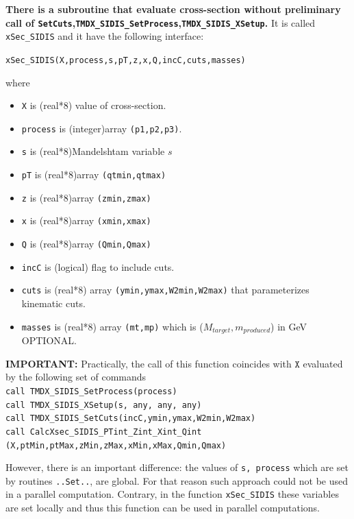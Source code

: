 \documentclass[prd,nofootinbib,eqsecnum,final]{revtex4}
\renewcommand{\(}{\left(}
\renewcommand{\)}{\right)}
\renewcommand{\[}{\left[}
\renewcommand{\]}{\right]}
\newcommand{\red}[1]{{\color[rgb]{1,0,0} #1}}
\newcommand{\blue}[1]{{\color{blue} #1}}
\begin{document}
\begin{tcolorbox}
\textbf{\blue{There is a subroutine that evaluate cross-section without preliminary call of \texttt{SetCuts},\texttt{TMDX\_SIDIS{\_}SetProcess},\texttt{TMDX\_SIDIS{\_}XSetup}}.} It is called \texttt{xSec\_SIDIS} and it have the following interface:

\begin{center}
\texttt{xSec\_SIDIS(X,process,s,pT,z,x,Q,incC,cuts,masses)}
\end{center}

where
\begin{itemize}
\item \texttt{X} is (real*8) value of cross-section.
\item \texttt{process} is (integer)array \texttt{(p1,p2,p3)}.
\item \texttt{s} is (real*8)Mandelshtam variable $s$
\item \texttt{pT} is (real*8)array \texttt{(qtmin,qtmax)}
\item \texttt{z} is (real*8)array \texttt{(zmin,zmax)}
\item \texttt{x} is (real*8)array \texttt{(xmin,xmax)}
\item \texttt{Q} is (real*8)array \texttt{(Qmin,Qmax)}
\item \texttt{incC} is (logical) flag to include cuts.
\item \texttt{cuts} is (real*8) array \texttt{(ymin,ymax,W2min,W2max)} that parameterizes kinematic cuts.
\item \texttt{masses} is (real*8) array \texttt{(mt,mp)} which is ($M_{target},m_{produced}$) in GeV \blue{OPTIONAL}.
\end{itemize}
\end{tcolorbox}
\textbf{IMPORTANT: } Practically, the call of this function coincides with $\texttt{X}$ evaluated by the following set of commands
\\
\texttt{call TMDX\_SIDIS{\_}SetProcess(process)}
\\
\texttt{call TMDX\_SIDIS{\_}XSetup(s,\red{any},\red{any},\red{any})}
\\
\texttt{call TMDX\_SIDIS{\_}SetCuts(incC,ymin,ymax,W2min,W2max)}
\\
\texttt{call CalcXsec\_SIDIS\_PTint\_Zint\_Xint\_Qint} \texttt{(X,ptMin,ptMax,zMin,zMax,xMin,xMax,Qmin,Qmax)}

However, there is an important difference: the values of \texttt{s, process} which are set by routines \texttt{..Set..}, are global. For that reason such approach could not be used in a parallel computation. Contrary, in the function \texttt{xSec\_SIDIS} these variables are set locally and thus this function can be used in parallel computations.
\end{document}
